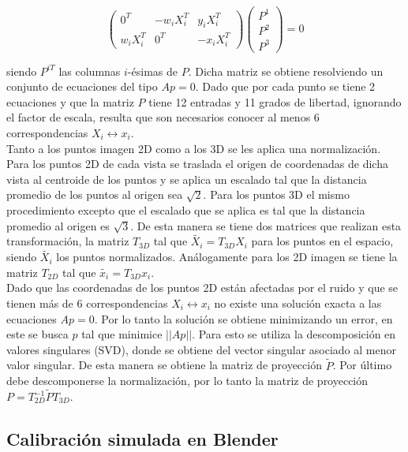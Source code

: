    \[
   \begin{pmatrix}
   0^T & -w_iX_i^T & y_iX_i^T \\
   w_iX_i^T & 0^T & -x_iX_i^T
   \end{pmatrix}
   \begin{pmatrix}
    P^1 \\
    P^2 \\
    P^3
   \end{pmatrix}
   = 0
   \]
   
 siendo $P^{iT}$ las columnas $i$-ésimas de $P$. Dicha matriz se obtiene resolviendo un conjunto de ecuaciones del tipo $Ap=0$.  Dado que por cada punto se tiene 2 ecuaciones y que la matriz $P$ tiene 12 entradas y 11 grados de libertad, ignorando el factor de escala, resulta que son necesarios conocer al menos 6 correspondencias $X_i \leftrightarrow x_i$.\\
 
 Tanto a los puntos imagen 2D como a los 3D se les aplica una normalización. Para los puntos 2D de cada vista se traslada el origen de coordenadas de dicha vista al centroide de los puntos y se aplica un escalado tal que la distancia promedio de los puntos al origen sea $\sqrt{2}$. Para los puntos 3D el mismo procedimiento excepto que el escalado que se aplica es tal que la distancia promedio al origen es $\sqrt{3}$. De esta manera se tiene dos matrices que realizan esta transformación, la matriz $T_{3D}$ tal que $\tilde{X_i} = T_{3D}^{}X_i$ para los puntos en el espacio, siendo $\tilde{X_i}$ los puntos normalizados. Análogamente para los 2D imagen se tiene la matriz $T_{2D}^{}$ tal que $\tilde{x_i} = T_{3D}^{}x_i$. \\
 
 Dado que las coordenadas de los puntos 2D están afectadas por el ruido y que se tienen más de 6 correspondencias $X_i \leftrightarrow x_i$ no existe una solución exacta a las ecuaciones $Ap=0$. Por lo tanto la solución se obtiene minimizando un error, en este se busca $p$ tal que minimice $||Ap||$. Para esto se utiliza la descomposición en valores singulares (SVD), donde se obtiene del vector singular asociado al menor valor singular. De esta manera se obtiene la matriz de proyección $\tilde{P}$. Por último debe descomponerse la normalización, por lo tanto la matriz de proyección $P = T_{2D}^{-1} \tilde{P} T_{3D}^{}$.
 
 \subsection{Calibración simulada en Blender}
 

